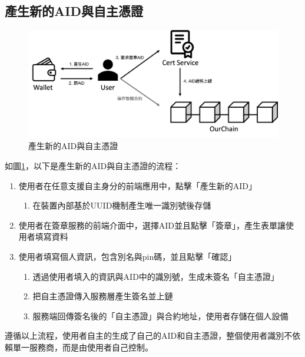 \subsection{產生新的AID與自主憑證}
\begin{figure}
  \centering
  \includegraphics[width=\linewidth, keepaspectratio]{figures/implement-1.png}
  \caption{產生新的AID與自主憑證}
  \label{fig:implement-1}
\end{figure}
如圖\ref{fig:implement-1}，以下是產生新的AID與自主憑證的流程：
\begin{enumerate}
  \item 使用者在任意支援自主身分的前端應用中，點擊「產生新的AID」
        \begin{enumerate}
          \item 在裝置內部基於UUID機制產生唯一識別號後存儲
        \end{enumerate}
  \item 使用者在簽章服務的前端介面中，選擇AID並且點擊「簽章」，產生表單讓使用者填寫資料
  \item 使用者填寫個人資訊，包含別名與pin碼，並且點擊「確認」
        \begin{enumerate}
          \item 透過使用者填入的資訊與AID中的識別號，生成未簽名「自主憑證」
          \item 把自主憑證傳入服務層產生簽名並上鏈
          \item 服務端回傳簽名後的「自主憑證」與合約地址，使用者存儲在個人設備
        \end{enumerate}
\end{enumerate}
遵循以上流程，使用者自主的生成了自己的AID和自主憑證，整個使用者識別不依賴單一服務商，而是由使用者自己控制。
